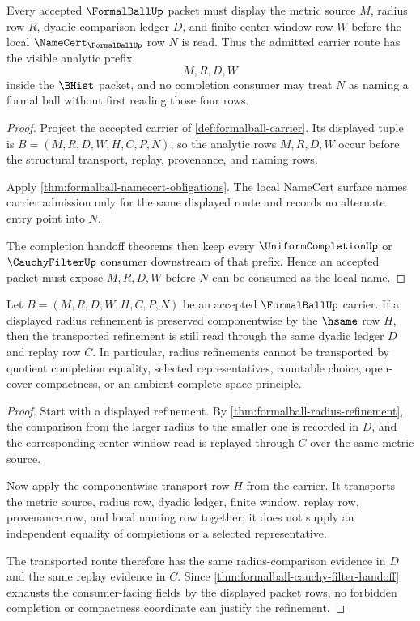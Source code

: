 \begin{theorem}
\label{thm:formal-ball-carrier-admission}
Every accepted $\FormalBallUp$ packet must display the metric source $M$, radius row $R$, dyadic comparison ledger $D$, and finite center-window row $W$ before the local $\NameCert_{\FormalBallUp}$ row $N$ is read. Thus the admitted carrier route has the visible analytic prefix
$$
M,R,D,W
$$
inside the $\BHist$ packet, and no completion consumer may treat $N$ as naming a formal ball without first reading those four rows.
\end{theorem}
\begin{proof}
Project the accepted carrier of \autoref{def:formalball-carrier}. Its displayed tuple is $B=(M,R,D,W,H,C,P,N)$, so the analytic rows $M,R,D,W$ occur before the structural transport, replay, provenance, and naming rows.

Apply \autoref{thm:formalball-namecert-obligations}. The local NameCert surface names carrier admission only for the same displayed route and records no alternate entry point into $N$.

The completion handoff theorems then keep every $\UniformCompletionUp$ or $\CauchyFilterUp$ consumer downstream of that prefix. Hence an accepted packet must expose $M,R,D,W$ before $N$ can be consumed as the local name.
\end{proof}

\begin{theorem}
\label{thm:formal-ball-directed-radius-transport}
Let $B=(M,R,D,W,H,C,P,N)$ be an accepted $\FormalBallUp$ carrier. If a displayed radius refinement is preserved componentwise by the $\hsame$ row $H$, then the transported refinement is still read through the same dyadic ledger $D$ and replay row $C$. In particular, radius refinements cannot be transported by quotient completion equality, selected representatives, countable choice, open-cover compactness, or an ambient complete-space principle.
\end{theorem}
\begin{proof}
Start with a displayed refinement. By \autoref{thm:formalball-radius-refinement}, the comparison from the larger radius to the smaller one is recorded in $D$, and the corresponding center-window read is replayed through $C$ over the same metric source.

Now apply the componentwise transport row $H$ from the carrier. It transports the metric source, radius row, dyadic ledger, finite window, replay row, provenance row, and local naming row together; it does not supply an independent equality of completions or a selected representative.

The transported route therefore has the same radius-comparison evidence in $D$ and the same replay evidence in $C$. Since \autoref{thm:formalball-cauchy-filter-handoff} exhausts the consumer-facing fields by the displayed packet rows, no forbidden completion or compactness coordinate can justify the refinement.
\end{proof}


